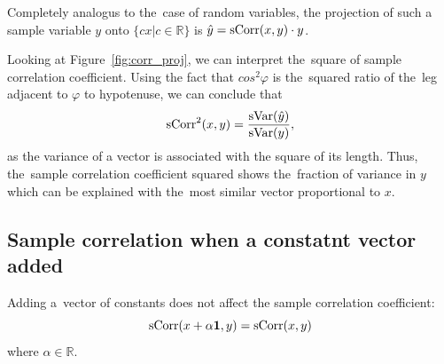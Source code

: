 Completely analogus to the~case of random variables,
the projection of such a sample variable $y$ onto
$\{cx| c \in \mathbb{R}\}$ is $\hat y = \operatorname{sCorr}(x,y) \cdot y$.

Looking at Figure~\ref{fig:corr_proj}, we can interpret the~square of sample correlation coefficient.
Using the fact that $cos^2 \varphi$ is the~squared ratio of
the~leg adjacent to $\varphi$ to hypotenuse, we can conclude that
\[
\operatorname{sCorr}^2(x,y) = \frac{\operatorname{sVar}(\hat y)}{\operatorname{sVar}(y)},
\]
as the variance of a vector is associated with the square of its length.
Thus, the~sample correlation coefficient squared shows
the~fraction of variance in $y$ which can be explained
with the~most similar vector proportional to $x$.


\subsection{Sample correlation when a constatnt vector added}


\begin{theorem}
Adding a~vector of constants does not affect the sample correlation coefficient:
\[
\operatorname{sCorr}(x + \alpha \mathbf{1}, y) = \operatorname{sCorr}(x,y)
\]
where $\alpha \in \mathbb{R}$.
\end{theorem}

